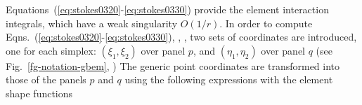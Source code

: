 \documentclass[oneside,onecolumn,10pt,final]{asme2ej}
\newcounter{tema}
\begin{document}
%
Equations~(\ref{eq:stokes0320}-\ref{eq:stokes0330})
provide the element interaction integrals, which have 
a weak singularity $O(1/r)$.
%
In order to compute Eqns.~(\ref{eq:stokes0320}-\ref{eq:stokes0330}),
\cite{rf:taylordj1,rf:jdelia-gbem1,rf:ssarraf-torus}, 
,
two sets of coordinates are introduced, one for each simplex: 
$(\xi_1,\xi_2)$   over panel $p$, and 
$(\eta_1,\eta_2)$ over panel $q$ %
(see Fig.~\ref{fg-notation-gbem}, ) 
%
%
The generic point coordinates are transformed into those of 
the panels $p$ and $q$ using the following expressions
%
%
with the element shape functions
%
\end{document}
